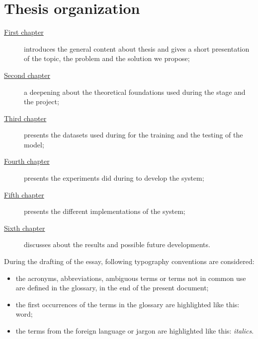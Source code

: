 \section{Thesis organization}\label{sec:thesis-organization}
\begin{description}
    \item[{\hyperref[ch:introduction]{First chapter}}] introduces the general content about thesis and gives a short presentation of the topic, the problem and the solution we propose;

    \item[{\hyperref[ch:theoretical-foundations]{Second chapter}}] a deepening about the theoretical foundations used during the stage and the project;

    \item[{\hyperref[ch:datasets]{Third chapter}}] presents the datasets used during for the training and the testing of the model;

    \item[{\hyperref[ch:experiments]{Fourth chapter}}] presents the experiments did during to develop the system;

    \item[{\hyperref[ch:implementations]{Fifth chapter}}] presents the different implementations of the system;

    \item[{\hyperref[ch:final-discussions]{Sixth chapter}}] discusses about the results and possible future developments.
\end{description}
During the drafting of the essay, following typography conventions are considered:
\begin{itemize}
    \item the acronyms, abbreviations, ambiguous terms or terms not in common use are defined in the glossary, in the end of the present document;
    \item the first occurrences of the terms in the glossary are highlighted like this: \gls{word};
    \item the terms from the foreign language or jargon are highlighted like this: \emph{italics}.
\end{itemize}